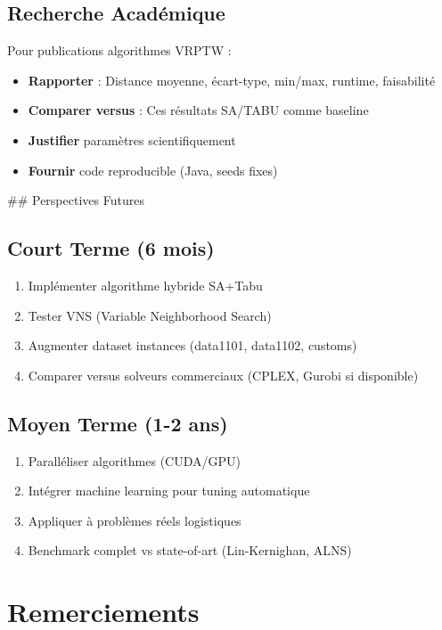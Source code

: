 \documentclass[12pt,a4paper,twoside]{report}
\begin{document}
\subsection{Recherche Académique}

Pour publications algorithmes VRPTW :
\begin{itemize}
    \item \textbf{Rapporter} : Distance moyenne, écart-type, min/max, runtime, faisabilité
    \item \textbf{Comparer versus} : Ces résultats SA/TABU comme baseline
    \item \textbf{Justifier} paramètres scientifiquement
    \item \textbf{Fournir} code reproducible (Java, seeds fixes)
\end{itemize}

## Perspectives Futures

\subsection{Court Terme (6 mois)}

\begin{enumerate}
    \item Implémenter algorithme hybride SA+Tabu
    \item Tester VNS (Variable Neighborhood Search)
    \item Augmenter dataset instances (data1101, data1102, customs)
    \item Comparer versus solveurs commerciaux (CPLEX, Gurobi si disponible)
\end{enumerate}

\subsection{Moyen Terme (1-2 ans)}

\begin{enumerate}
    \item Paralléliser algorithmes (CUDA/GPU)
    \item Intégrer machine learning pour tuning automatique
    \item Appliquer à problèmes réels logistiques
    \item Benchmark complet vs state-of-art (Lin-Kernighan, ALNS)
\end{enumerate}

\section{Remerciements}
\end{document}
